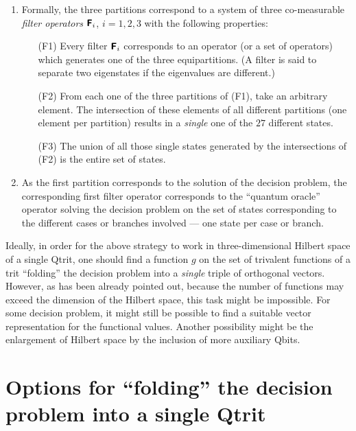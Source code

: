 \documentclass[fleqn,twoside]{article}
\begin{document}
\begin{enumerate}
\item
Formally, the three partitions correspond to a system of three co-measurable
{\em filter operators} $\textsf{\textbf{F}}_i$, $i=1,2,3$
with the following properties:
\begin{enumerate}
\item[(F1)]
Every filter $\textsf{\textbf{F}}_i$
corresponds to an operator (or a set of operators)
which generates one of the three
equipartitions.
(A filter is said to separate two eigenstates if the eigenvalues are different.)
\item[(F2)]
From each one of the three partitions of (F1), take an arbitrary element.
The intersection of these elements of all different partitions (one element per partition)
results in a {\it single} one of the $27$ different states.
\item[(F3)]
The union of all those single states generated by the intersections of (F2)
is the entire set of states.
\end{enumerate}

\item
As the first partition corresponds to the solution of the decision problem,
the corresponding first filter operator corresponds to the ``quantum oracle'' operator solving the decision problem
on the set of states corresponding to the different cases or branches involved --- one state per case or branch.

\end{enumerate}


Ideally, in order for the above strategy to work in three-dimensional Hilbert space of a single Qtrit,
one should find a function $g$ on the set of trivalent functions of a trit ``folding'' the decision problem  into a  {\em single} triple of orthogonal vectors.
However, as has been already pointed out, because the number of functions may exceed the dimension of the Hilbert space, this task might be impossible.
For some decision problem, it might still be possible to find a suitable vector representation for the functional values.
Another possibility might be the enlargement of Hilbert space by the inclusion of more auxiliary Qbits.

\section{Options for ``folding'' the decision problem into a single Qtrit}
\end{document}
